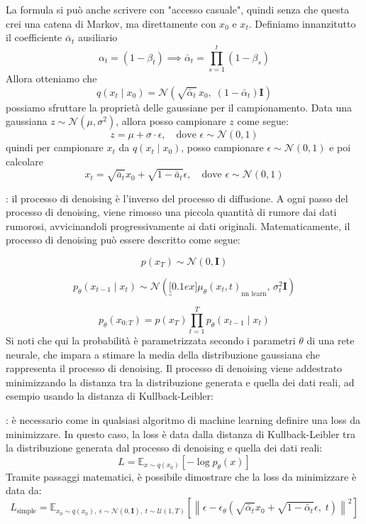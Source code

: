 La formula si può anche scrivere con "accesso casuale", quindi senza che questa crei una catena di Markov, ma direttamente con $ x_0 $ e $ x_t $. Definiamo innanzitutto il coefficiente $ \overline{\alpha}_t $ ausiliario
\[
	\alpha_t = (1 - \beta_t) \implies \bar{\alpha}_t = \prod_{s=1}^{t} (1 - \beta_s)
\]
Allora otteniamo che
\[
	q(x_t \mid x_0) = \mathcal{N}\left(\sqrt{\bar{\alpha}_t} \, x_0,\; (1 - \bar{\alpha}_t)\mathbf{I}\right)
\]
possiamo sfruttare la proprietà delle gaussiane per il campionamento. Data una gaussiana $ z \sim \mathcal{N}\left(\mu , \sigma^2 \right) $, allora posso campionare $ z $ come segue:
\[
	z = \mu  + \sigma \cdot \epsilon, \quad \text{dove } \epsilon \sim \mathcal{N}(0, 1)
\]
quindi per campionare $ x_t $ da $ q(x_t \mid x_0) $, posso campionare $ \epsilon \sim \mathcal{N}(0, 1) $ e poi calcolare
\[
	x_t = \sqrt{\bar{a}_t}x_0 + \sqrt{1 - \bar{a}_t} \epsilon, \quad \text{dove } \epsilon \sim \mathcal{N}(0, 1)
\]

: il processo di denoising è l'inverso del processo di diffusione. A ogni passo del processo di denoising, viene rimosso una piccola quantità di rumore dai dati rumorosi, avvicinandoli progressivamente ai dati originali. Matematicamente, il processo di denoising può essere descritto come segue:

\[
	p(x_T) \sim \mathcal{N}(0, \mathbf{I})
\]

\[
	p_\theta(x_{t-1}\mid x_t) \sim \mathcal{N}\left(\underbracket[0.1ex]{\mu_\theta(x_t, t)}_{\text{nn learn}},\, \sigma_t^2 \mathbf{I}\right)
\]

\[
	p_\theta(x_{0:T}) = p(x_T) \prod_{t=1}^T p_\theta(x_{t-1}\mid x_t)
\]
Si noti che qui la probabilità è parametrizzata secondo i parametri $ \theta $ di una rete neurale, che impara a stimare la media della distribuzione gaussiana che rappresenta il processo di denoising. Il processo di denoising viene addestrato minimizzando la distanza tra la distribuzione generata e quella dei dati reali, ad esempio usando la distanza di Kullback-Leibler:

\vskip3mm
: è necessario come in qualsiasi algoritmo di machine learning definire una loss da minimizzare. In questo caso, la loss è data dalla distanza di Kullback-Leibler tra la distribuzione generata dal processo di denoising e quella dei dati reali:
\[
	L = \mathbb{E}_{x \sim q(x_0)} \left[ -\log p_\theta(x) \right]
\]
Tramite passaggi matematici, è possibile dimostrare che la loss da minimizzare è data da:
\[
	L_{\text{simple}} =
	\mathbb{E}_{x_0 \sim q(x_0),\; \epsilon \sim \mathcal{N}(0, \mathbf{I}),\; t \sim \mathcal{U}(1, T)}
	\left[
		\left\| \epsilon - \epsilon_\theta \left(
		\sqrt{\bar{\alpha}_t} x_0 + \sqrt{1 - \bar{\alpha}_t} \epsilon,\; t
		\right) \right\|^2
		\right]
\]

